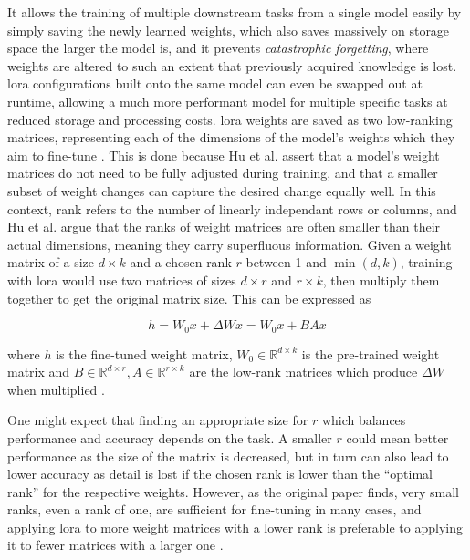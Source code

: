 It allows the training of multiple downstream tasks from a single model easily by simply saving the newly learned weights, which also saves massively on storage space the larger the model is, and it prevents \emph{catastrophic forgetting}, where weights are altered to such an extent that previously acquired knowledge is lost.
\ac{lora} configurations built onto the same model can even be swapped out at runtime, allowing a much more performant model for multiple specific tasks at reduced storage and processing costs.
\ac{lora} weights are saved as two low-ranking matrices, representing each of the dimensions of the model's weights which they aim to fine-tune \cite{Hu.2022}.
This is done because Hu et al. assert that a model's weight matrices do not need to be fully adjusted during training, and that a smaller subset of weight changes can capture the desired change equally well.
In this context, rank refers to the number of linearly independant rows or columns, and Hu et al. argue that the ranks of weight matrices are often smaller than their actual dimensions, meaning they carry superfluous information.
Given a weight matrix of a size $d \times k$ and a chosen rank $r$ between 1 and $\min(d,k)$, training with \ac{lora} would use two matrices of sizes $d \times r$ and $r \times k$, then multiply them together to get the original matrix size.
This can be expressed as

\begin{equation}
    h = W_0x + \Delta Wx = W_0x + BAx
\end{equation}

where $h$ is the fine-tuned weight matrix, $W_0 \in \mathbb{R}^{d\times k}$ is the pre-trained weight matrix and $B \in \mathbb{R}^{d\times r}, A \in \mathbb{R}^{r\times k}$ are the low-rank matrices which produce $\Delta W$ when multiplied \cite{Hu.2022}.

One might expect that finding an appropriate size for $r$ which balances performance and accuracy depends on the task.
A smaller $r$ could mean better performance as the size of the matrix is decreased, but in turn can also lead to lower accuracy as detail is lost if the chosen rank is lower than the \enquote{optimal rank} for the respective weights.
However, as the original paper finds, very small ranks, even a rank of one, are sufficient for fine-tuning in many cases, and applying \ac{lora} to more weight matrices with a lower rank is preferable to applying it to fewer matrices with a larger one \cite{Hu.2022}.

